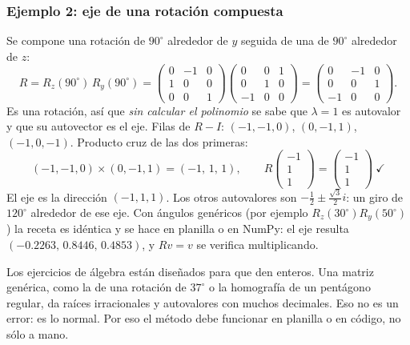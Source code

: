 \subsubsection{Ejemplo 2: eje de una rotación compuesta}

Se compone una rotación de \(90^\circ\) alrededor de \(y\) seguida de una de \(90^\circ\)
alrededor de \(z\):
\[
  R=R_z(90^\circ)\,R_y(90^\circ)=
  \begin{pmatrix}0&-1&0\\1&0&0\\0&0&1\end{pmatrix}
  \begin{pmatrix}0&0&1\\0&1&0\\-1&0&0\end{pmatrix}
  =\begin{pmatrix}0&-1&0\\0&0&1\\-1&0&0\end{pmatrix}.
\]
Es una rotación, así que \emph{sin calcular el polinomio} se sabe que \(\lambda=1\) es
autovalor y que su autovector es el eje. Filas de \(R-I\): \((-1,-1,0)\), \((0,-1,1)\),
\((-1,0,-1)\). Producto cruz de las dos primeras:
\[
  (-1,-1,0)\times(0,-1,1)=(-1,\,1,\,1),
  \qquad
  R\begin{pmatrix}-1\\1\\1\end{pmatrix}=\begin{pmatrix}-1\\1\\1\end{pmatrix}\ \checkmark
\]
El eje es la dirección \((-1,1,1)\). Los otros autovalores son \(-\frac12\pm\frac{\sqrt3}2 i\):
un giro de \(120^\circ\) alrededor de ese eje. Con ángulos genéricos (por ejemplo
\(R_z(30^\circ)R_y(50^\circ)\)) la receta es idéntica y se hace en planilla o en NumPy: el
eje resulta \((-0.2263,\,0.8446,\,0.4853)\), y \(Rv=v\) se verifica multiplicando.

\begin{atencion}
Los ejercicios de álgebra están diseñados para que den enteros. Una matriz genérica, como
la de una rotación de \(37^\circ\) o la homografía de un pentágono regular, da raíces
irracionales y autovalores con muchos decimales. Eso no es un error: es lo normal. Por eso
el método debe funcionar en planilla o en código, no sólo a mano.
\end{atencion}

